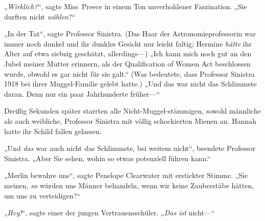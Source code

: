„\emph{Wirklich?}“, sagte Miss~Preece in einem Ton unverhohlener Faszination.
„Sie durften nicht \emph{wählen}?“

„In der Tat“, sagte Professor Sinistra. (Das Haar der Astronomieprofessorin war immer noch dunkel und ihr dunkles Gesicht nur leicht faltig; Hermine \emph{hätte} ihr Alter auf etwa siebzig geschätzt, allerdings—)
„Ich kann mich noch gut an den Jubel meiner Mutter erinnern, als der Qualification of Women Act beschlossen wurde, obwohl es gar nicht für sie galt.“ (Was bedeutete, dass Professor Sinistra 1918 bei ihrer Muggel-Familie gelebt hatte.)
„Und das war nicht das Schlimmste daran. Denn nur ein paar Jahrhunderte früher—“

Dreißig Sekunden später starrten alle Nicht-Muggel-stämmigen, sowohl männliche als auch weibliche, Professor Sinistra mit völlig schockierten Mienen an. Hannah hatte ihr Schild fallen gelassen.

„Und \emph{das} war auch nicht das Schlimmste, bei weitem nicht“, beendete Professor Sinistra.
„Aber Sie sehen, wohin so etwas potenziell führen kann.“

„Merlin bewahre uns“, sagte Penelope Clearwater mit erstickter Stimme.
„Sie meinen, \emph{so} würden uns Männer behandeln, wenn wir keine Zauberstäbe hätten, um uns zu verteidigen?“

„\emph{Hey!}“, sagte einer der jungen Vertrauensschüler. „\emph{Das ist} nicht—“


